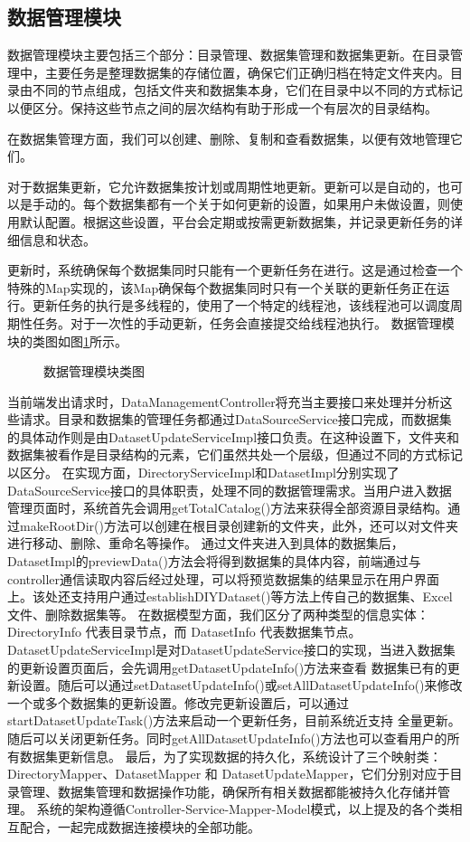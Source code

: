 \subsection{数据管理模块}
数据管理模块主要包括三个部分：目录管理、数据集管理和数据集更新。在目录管理中，主要任务是整理数据集的存储位置，确保它们正确归档在特定文件夹内。目录由不同的节点组成，包括文件夹和数据集本身，它们在目录中以不同的方式标记以便区分。保持这些节点之间的层次结构有助于形成一个有层次的目录结构。

在数据集管理方面，我们可以创建、删除、复制和查看数据集，以便有效地管理它们。

对于数据集更新，它允许数据集按计划或周期性地更新。更新可以是自动的，也可以是手动的。每个数据集都有一个关于如何更新的设置，如果用户未做设置，则使用默认配置。根据这些设置，平台会定期或按需更新数据集，并记录更新任务的详细信息和状态。

更新时，系统确保每个数据集同时只能有一个更新任务在进行。这是通过检查一个特殊的Map实现的，该Map确保每个数据集同时只有一个关联的更新任务正在运行。更新任务的执行是多线程的，使用了一个特定的线程池，该线程池可以调度周期性任务。对于一次性的手动更新，任务会直接提交给线程池执行。
数据管理模块的类图如图\ref{fig:datamanageclass}所示。
\begin{figure}[H]
    \centering
    \caption{数据管理模块类图}
    \label{fig:datamanageclass}
\end{figure}
当前端发出请求时，DataManagementController将充当主要接口来处理并分析这些请求。目录和数据集的管理任务都通过DataSourceService接口完成，而数据集的具体动作则是由DatasetUpdateServiceImpl接口负责。在这种设置下，文件夹和数据集被看作是目录结构的元素，它们虽然共处一个层级，但通过不同的方式标记以区分。
在实现方面，DirectoryServiceImpl和DatasetImpl分别实现了DataSourceService接口的具体职责，处理不同的数据管理需求。当用户进入数据管理页面时，系统首先会调用getTotalCatalog()方法来获得全部资源目录结构。通过makeRootDir()方法可以创建在根目录创建新的文件夹，此外，还可以对文件夹进行移动、删除、重命名等操作。
通过文件夹进入到具体的数据集后，DatasetImpl的previewData()方法会将得到数据集的具体内容，前端通过与controller通信读取内容后经过处理，可以将预览数据集的结果显示在用户界面上。该处还支持用户通过establishDIYDataset()等方法上传自己的数据集、Excel文件、删除数据集等。
在数据模型方面，我们区分了两种类型的信息实体：DirectoryInfo 代表目录节点，而 DatasetInfo 代表数据集节点。DatasetUpdateServiceImpl是对DatasetUpdateService接口的实现，当进入数据集的更新设置页面后，会先调用getDatasetUpdateInfo()方法来查看
数据集已有的更新设置。随后可以通过setDatasetUpdateInfo()或setAllDatasetUpdateInfo()来修改一个或多个数据集的更新设置。修改完更新设置后，可以通过startDatasetUpdateTask()方法来启动一个更新任务，目前系统近支持
全量更新。随后可以关闭更新任务。同时getAllDatasetUpdateInfo()方法也可以查看用户的所有数据集更新信息。
最后，为了实现数据的持久化，系统设计了三个映射类：DirectoryMapper、DatasetMapper 和 DatasetUpdateMapper，它们分别对应于目录管理、数据集管理和数据操作功能，确保所有相关数据都能被持久化存储并管理。
系统的架构遵循Controller-Service-Mapper-Model模式，以上提及的各个类相互配合，一起完成数据连接模块的全部功能。
